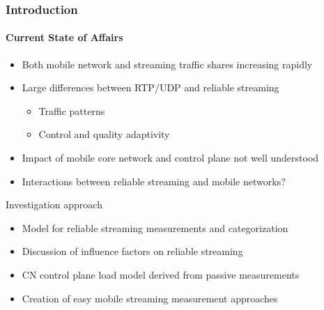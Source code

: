 \documentclass{beamer}
\begin{document}
\begin{frame}
	\frametitle{Introduction}
	\framesubtitle{Current State of Affairs}

	\begin{itemize}
		\item Both mobile network and streaming traffic shares increasing rapidly
		\item Large differences between RTP/UDP and reliable streaming
		\begin{itemize}
			\item Traffic patterns
			\item Control and quality adaptivity
		\end{itemize}
		\item Impact of mobile core network and control plane not well understood
		\item Interactions between reliable streaming and mobile networks?
	\end{itemize}

	\pause
	\begin{block}{Investigation approach}
	\begin{itemize}
		\item Model for reliable streaming measurements and categorization
		\item Discussion of influence factors on reliable streaming
		\item CN control plane load model derived from passive measurements
		\item Creation of easy mobile streaming measurement approaches
	\end{itemize}
	\end{block}
\end{frame}
\end{document}
